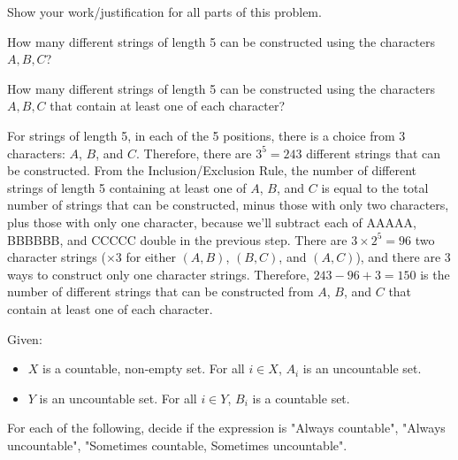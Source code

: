 \documentclass[11pt]{article}
\begin{document}

Show your work/justification for all parts of this problem.
\begin{Parts}
    \Part How many different strings of length 5 can be constructed using the 
    characters $A, B, C$?

    \Part How many different strings of length 5 can be constructed using the 
    characters $A, B, C$ that contain at least one of each character?

\end{Parts}

\begin{solution}
    \begin{Parts}
        \Part For strings of length 5, in each of the 5 positions, there is a
        choice from 3 characters: $A$, $B$, and $C$. Therefore, there are $3^5
        = 243$ different strings that can be constructed. 
        \Part From the Inclusion/Exclusion Rule, the number of different strings
        of length 5 containing at least one of $A$, $B$, and $C$ is equal to the
        total number of strings that can be constructed, minus those with only 
        two characters, plus those with only one character, because we'll subtract
        each of AAAAA, BBBBBB, and CCCCC double in the previous step. There
        are $3 \times 2^5 = 96$ two character strings ($\times 3$ for either $(A, B)$,
        $(B, C)$, and $(A, C)$), and there are 3 ways to construct only one character 
        strings. Therefore, $243-96+3=150$ is the number of different strings that
        can be constructed from $A$, $B$, and $C$ that contain at least one of each
        character. 
    \end{Parts}
\end{solution}


Given:
\begin{itemize}
\item $X$ is a countable, non-empty set. For all $i \in X$, $A_i$ is an uncountable set.
\item $Y$ is an uncountable set. For all $i \in Y$, $B_i$ is a countable set.
\end{itemize}

For each of the following, decide if the expression is
"Always countable", "Always uncountable", "Sometimes countable,
Sometimes uncountable".
\end{document}
